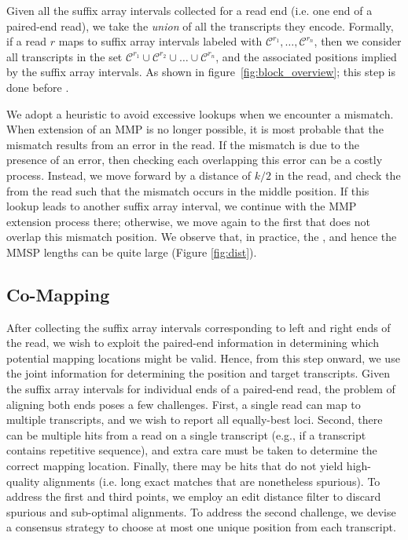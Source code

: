 Given all the suffix array intervals collected for a read end (i.e. one end of a 
paired-end read), we take the \emph{union} of all the transcripts they encode. 
Formally, if  a read $r$ maps to suffix array intervals labeled with $\mathcal{C}^{r_1}, 
\ldots, \mathcal{C}^{r_n}$, then we consider all transcripts in the set $\mathcal{C}^{r_1} 
\cup \mathcal{C}^{r_2} \cup \ldots \cup \mathcal{C}^{r_n}$, and the associated positions 
implied by the suffix array intervals. As shown in figure~\ref{fig:block_overview}; 
this step is done before \cm.

We adopt a heuristic to avoid excessive \kmer lookups when we encounter a mismatch. 
When extension of an MMP is no longer possible, it is most probable that the mismatch 
results from an error in the read. If the mismatch is due to the presence of an error, 
then checking each \kmer overlapping this error can be a costly process. Instead, 
we move forward by a distance of $k/2$ in the read, and check the \kmer from the read 
such that the mismatch occurs in the middle position. If this \kmer lookup leads to 
another suffix array interval, we continue with the MMP extension process there; 
otherwise, we move again to the first \kmer that does not overlap this mismatch 
position. We observe that, in practice, the \kslcp, and hence the MMSP lengths can 
be quite large (Figure \ref{fig:dist}).

\subsection{Co-Mapping}
After collecting the suffix array intervals corresponding to left and right ends of the read, we wish to exploit 
the paired-end information in determining which potential mapping locations might be valid.  Hence, from this step 
onward, we use the joint information for determining the position and target transcripts. Given the suffix array 
intervals for individual ends of a paired-end read, the problem of aligning both ends poses a few challenges. 
First, a single read can map to multiple transcripts, and we wish to report all equally-best loci. Second, there 
can be multiple hits from a read on a single transcript (e.g., if a transcript contains repetitive sequence), and 
extra care must be taken to determine the correct mapping location. Finally, there may be hits that do not yield 
high-quality alignments (i.e. long exact matches that are nonetheless spurious).  To address the first and third 
points, we employ an edit distance filter to discard spurious and sub-optimal alignments.  To address the second 
challenge, we devise a consensus strategy to choose at most one unique position from each transcript.

